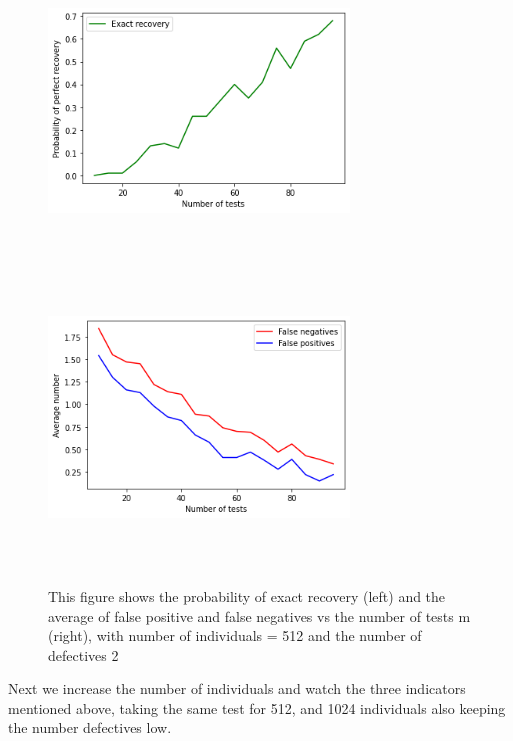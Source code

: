 \begin{figure}[H]
	\includegraphics[height=8cm, width=8cm]{images/index1}
	\includegraphics[height=8cm, width=8cm]{images/index}
	\caption{This figure shows the probability of exact recovery (left) and  the average of false positive and false negatives vs the number of tests m (right), with number of individuals  = 512 and the number of defectives 2}
	\label{exat}
\end{figure}


Next we increase the number of individuals and watch the three indicators mentioned above, taking the same test for 512, and 1024 individuals also keeping the number defectives low. 

